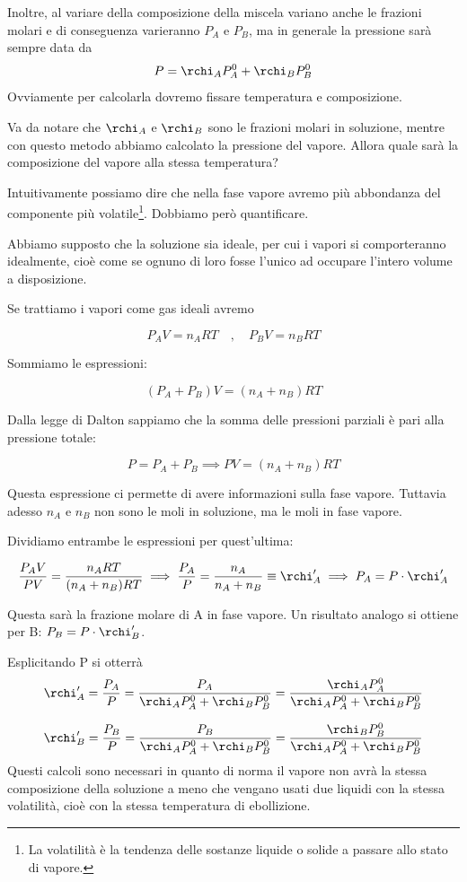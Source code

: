 Inoltre, al variare della composizione della miscela variano anche le frazioni molari e di conseguenza varieranno $P_A$ e $P_B$, ma in generale la pressione sarà sempre data da
$$P=\rchi_A P^0_A + \rchi_B P^0_B$$
Ovviamente per calcolarla dovremo fissare temperatura e composizione.

Va da notare che $\rchi_A$ e $\rchi_B$ sono le frazioni molari in soluzione, mentre con questo metodo abbiamo calcolato la pressione del vapore. Allora quale sarà la composizione del vapore alla stessa temperatura?

Intuitivamente possiamo dire che nella fase vapore avremo più abbondanza del componente più volatile\footnote{La volatilità è la tendenza delle sostanze liquide o solide a passare allo stato di vapore.}. Dobbiamo però quantificare.

Abbiamo supposto che la soluzione sia ideale, per cui i vapori si comporteranno idealmente, cioè come se ognuno di loro fosse l'unico ad occupare l'intero volume a disposizione.

Se trattiamo i vapori come gas ideali avremo

$$P_AV=n_ART
\quad,\quad
P_BV=n_BRT$$

Sommiamo le espressioni:

$$(P_A + P_B)V= (n_A + n_B)RT$$

Dalla legge di Dalton sappiamo che la somma delle pressioni parziali è pari alla pressione totale:

$$P=P_A + P_B \implies PV=(n_A + n_B)RT$$

Questa espressione ci permette di avere informazioni sulla fase vapore. Tuttavia adesso $n_A$ e $n_B$ non sono le moli in soluzione, ma le moli in fase vapore.

Dividiamo entrambe le espressioni per quest'ultima:

$$\frac{P_AV}{PV}= \frac{n_ART}{(n_A + n_B)RT}
\implies
\frac{P_A}{P} = \frac{n_A}{n_A + n_B}\equiv \rchi '_A
\implies
P_A=P \cdot \rchi '_A$$

Questa sarà la frazione molare di A in fase vapore. Un risultato analogo si ottiene per B: $P_B=P \cdot \rchi '_B$.

Esplicitando P si otterrà
$$\rchi '_A=\frac{P_A}{P}=
\frac{P_A}{\rchi_A P_A^0 + \rchi_B P_B^0}=
\frac{\rchi_A P_A^0}{\rchi_A P_A^0 + \rchi_B P_B^0}$$

$$\rchi '_B=\frac{P_B}{P}=
\frac{P_B}{\rchi_A P_A^0 + \rchi_B P_B^0}=
\frac{\rchi_B P_B^0}{\rchi_A P_A^0 + \rchi_B P_B^0}$$
Questi calcoli sono necessari in quanto di norma il vapore non avrà la stessa composizione della soluzione a meno che vengano usati due liquidi con la stessa volatilità, cioè con la stessa temperatura di ebollizione.

